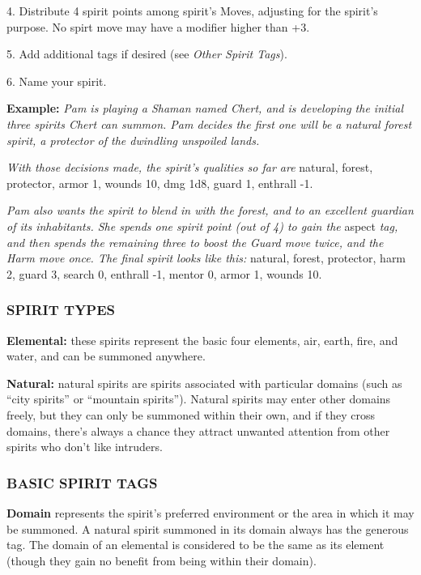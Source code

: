 \documentclass[oneside,10pt]{article}
\begin{document}
\begin{multicols}{2}
\begin{dent}
4.	Distribute 4 spirit points among spirit’s Moves, adjusting for the spirit’s purpose. No spirt move may have a
modifier higher than +3.

5.	Add additional tags if desired (see \textit{Other Spirit Tags}).

6.	Name your spirit.

\textbf{Example:} \textit{Pam is playing a Shaman named Chert, and is
developing the initial three spirits Chert can summon. Pam
decides the first one will be a natural forest spirit, a protector of the dwindling unspoiled lands.}

\textit{With those decisions made, the spirit’s qualities so far are}
natural, forest, protector, armor 1, wounds 10, dmg 1d8,
guard 1, enthrall -1.

\textit{Pam also wants the spirit to blend in with the forest, and
to an excellent guardian of its inhabitants. She spends
one spirit point (out of 4) to gain the} aspect \textit{tag, and then
spends the remaining three to boost the Guard move
twice, and the Harm move once. The final spirit looks like
this:} natural, forest, protector, harm 2, guard 3, search 0,
enthrall -1, mentor 0, armor 1, wounds 10.
\end{dent}
\subsubsection{SPIRIT TYPES}
\begin{dent}

\textbf{Elemental:} these spirits represent the basic four elements,
air, earth, fire, and water, and can be summoned anywhere.

\textbf{Natural:} natural spirits are spirits associated with particular domains (such as ``city spirits'' or ``mountain spirits'').
Natural spirits may enter other domains freely, but they
can only be summoned within their own, and if they cross
domains, there’s always a chance they attract unwanted
attention from other spirits who don’t like intruders.
\end{dent}
\subsubsection{BASIC SPIRIT TAGS}
\textbf{Domain} represents the spirit’s preferred environment or the
area in which it may be summoned. A natural spirit summoned in its domain always has the generous tag. The domain of an elemental is considered to be the same as its element (though they gain no benefit from being within their
domain).
\begin{dent}


\end{dent}
\end{multicols}
\end{document}

